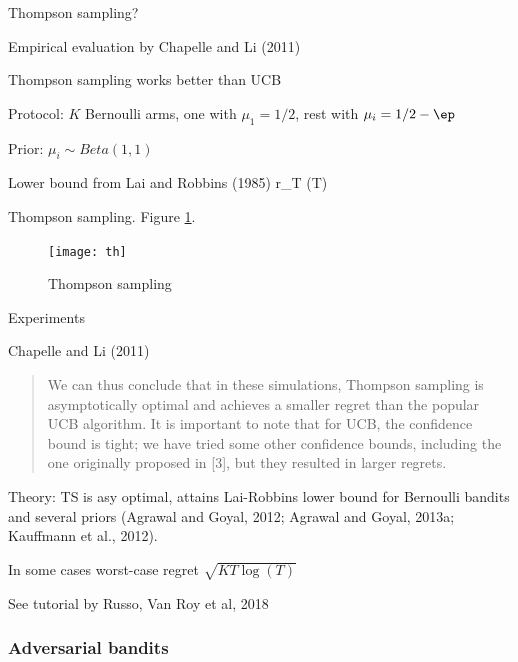 \documentclass[english]{article}
\begin{document}
\item {Thompson sampling?}
\bitem
\item Empirical evaluation by Chapelle and Li (2011)
\item Thompson sampling works better than UCB
\item Protocol: $K$ Bernoulli arms, one with $\mu_1=1/2$, rest with $\mu_i=1/2-\ep$
\item Prior: $\mu_i\sim Beta(1,1)$
\item Lower bound from  Lai and Robbins (1985)
\beqs r_T \ge \log(T)\cdot
\left[ \sum_{i=1}^K \frac{\Delta_i}{D_{KL}(\mu_i\|\mu^*)}+o(1)\right]
\eeqs
\eitem



\item {Thompson sampling}. Figure \ref{Thompson sampling}.
\begin{figure}
\begin{center}
\texttt{[image: th]}
    \caption{Thompson sampling}
    \label{Thompson sampling}
\end{center}
\end{figure}



\item {Experiments}
\bitem
\item Chapelle and Li (2011)
\begin{quote}
We can thus conclude that in these simulations, Thompson sampling is asymptotically optimal and
achieves a smaller regret than the popular UCB algorithm. It is important to note that for UCB,
the confidence bound is tight; we have tried some other confidence bounds, including the one
originally proposed in [3], but they resulted in larger regrets.
\end{quote}
\item Theory: TS is asy optimal, attains Lai-Robbins lower bound for Bernoulli bandits and several priors (Agrawal and Goyal, 2012; Agrawal and Goyal,
2013a; Kauffmann et al., 2012).
\item In some cases worst-case regret $\sqrt{KT\log(T)}$
\item See tutorial by Russo, Van Roy et al, 2018
\eitem


\eenum

\subsubsection{Adversarial bandits}
\end{document}
